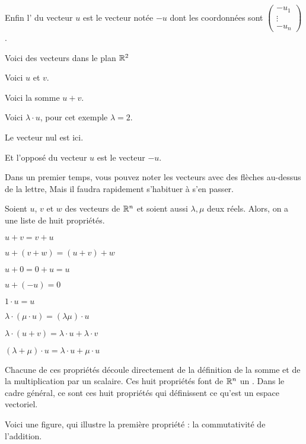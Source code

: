 \change
Enfin l' du vecteur $u$
est le vecteur notée $-u$
dont les coordonnées sont 
$\left(\begin{smallmatrix} -u_1\\ \vdots \\ -u_n \end{smallmatrix}\right)$.


\diapo

Voici des vecteurs dans le plan $\mathbb{R}^2$ 

Voici $u$ et $v$.

Voici la somme $u+v$.

Voici $\lambda\cdot u$, pour cet exemple $\lambda = 2$.

Le vecteur nul est ici.

Et l'opposé du vecteur $u$ est le vecteur $-u$.

Dans un premier temps, vous pouvez noter les vecteurs avec des flèches au-dessus de la lettre,
Mais il faudra rapidement s'habituer à s'en passer.

\diapo


  Soient $u$, $v$ et $w$ des vecteurs de $\mathbb{R}^n$
  et soient aussi $\lambda, \mu$ deux réels. Alors, on a 
  une liste de huit propriétés.

 \change 
 $u + v = v + u$
 
 \change 
 $u + (v+w) = (u+v) +w$
 
 \change 
 $u + 0 = 0 + u = u$
 
 \change 
 $u + (-u) = 0$
 
 \change 
 $1 \cdot u = u$
 
 \change 
 $\lambda \cdot (\mu \cdot u) = (\lambda\mu )\cdot u$
 
 \change 
 $\lambda \cdot (u+v) = \lambda \cdot u + \lambda \cdot v$
 
 \change 
 $(\lambda + \mu ) \cdot u = \lambda \cdot u + \mu \cdot u$


Chacune de ces propriétés découle directement de la définition de la somme 
et de la multiplication par un scalaire. Ces huit propriétés font de $\mathbb{R}^n$ un
. Dans le cadre général, ce sont ces huit propriétés qui définissent 
ce qu'est un espace vectoriel.

\diapo

Voici une figure, qui illustre la première propriété : 
la commutativité de l'addition.

